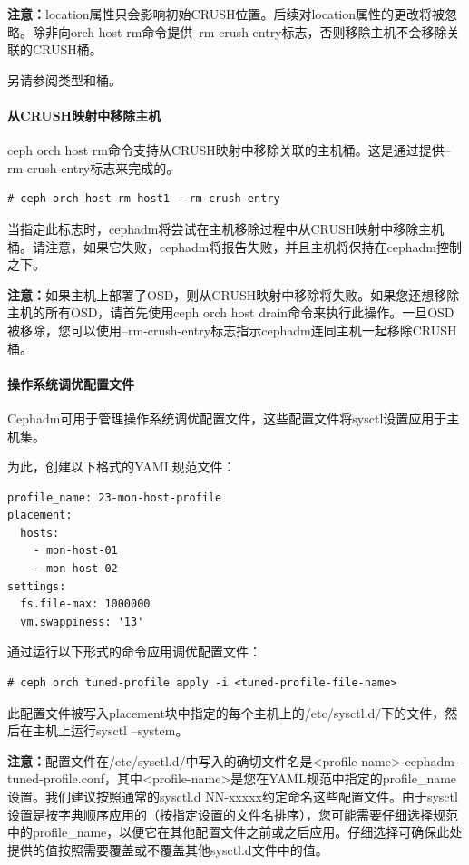 \documentclass[12pt,UTF8]{ctexbook}
\begin{document}
\textbf{注意：}location属性只会影响初始CRUSH位置。后续对location属性的更改将被忽略。除非向orch host rm命令提供--rm-crush-entry标志，否则移除主机不会移除关联的CRUSH桶。

另请参阅类型和桶。

\paragraph{从CRUSH映射中移除主机}

ceph orch host rm命令支持从CRUSH映射中移除关联的主机桶。这是通过提供--rm-crush-entry标志来完成的。
\begin{verbatim}
# ceph orch host rm host1 --rm-crush-entry
\end{verbatim}

当指定此标志时，cephadm将尝试在主机移除过程中从CRUSH映射中移除主机桶。请注意，如果它失败，cephadm将报告失败，并且主机将保持在cephadm控制之下。

\textbf{注意：}如果主机上部署了OSD，则从CRUSH映射中移除将失败。如果您还想移除主机的所有OSD，请首先使用ceph orch host drain命令来执行此操作。一旦OSD被移除，您可以使用--rm-crush-entry标志指示cephadm连同主机一起移除CRUSH桶。

\paragraph{操作系统调优配置文件}

Cephadm可用于管理操作系统调优配置文件，这些配置文件将sysctl设置应用于主机集。

为此，创建以下格式的YAML规范文件：
\begin{verbatim}
profile_name: 23-mon-host-profile
placement:
  hosts:
    - mon-host-01
    - mon-host-02
settings:
  fs.file-max: 1000000
  vm.swappiness: '13'
\end{verbatim}

通过运行以下形式的命令应用调优配置文件：
\begin{verbatim}
# ceph orch tuned-profile apply -i <tuned-profile-file-name>
\end{verbatim}

此配置文件被写入placement块中指定的每个主机上的/etc/sysctl.d/下的文件，然后在主机上运行sysctl --system。

\textbf{注意：}配置文件在/etc/sysctl.d/中写入的确切文件名是<profile-name>-cephadm-tuned-profile.conf，其中<profile-name>是您在YAML规范中指定的profile_name设置。我们建议按照通常的sysctl.d NN-xxxxx约定命名这些配置文件。由于sysctl设置是按字典顺序应用的（按指定设置的文件名排序），您可能需要仔细选择规范中的profile_name，以便它在其他配置文件之前或之后应用。仔细选择可确保此处提供的值按照需要覆盖或不覆盖其他sysctl.d文件中的值。
\end{document}
